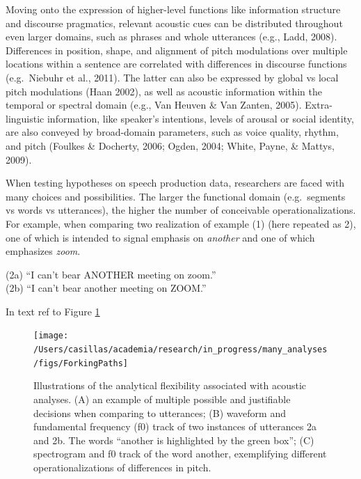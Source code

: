 \documentclass[
  english,
  man,floatsintext]{apa6}
\begin{document}
Moving onto the expression of higher-level functions like information structure and discourse pragmatics, relevant acoustic cues can be distributed throughout even larger domains, such as phrases and whole utterances (e.g., Ladd, 2008).
Differences in position, shape, and alignment of pitch modulations over multiple locations within a sentence are correlated with differences in discourse functions (e.g.~Niebuhr et al., 2011).
The latter can also be expressed by global vs local pitch modulations (Haan 2002), as well as acoustic information within the temporal or spectral domain (e.g., Van Heuven \& Van Zanten, 2005).
Extra-linguistic information, like speaker's intentions, levels of arousal or social identity, are also conveyed by broad-domain parameters, such as voice quality, rhythm, and pitch (Foulkes \& Docherty, 2006; Ogden, 2004; White, Payne, \& Mattys, 2009).

When testing hypotheses on speech production data, researchers are faced with many choices and possibilities.
The larger the functional domain (e.g.~segments vs words vs utterances), the higher the number of conceivable operationalizations.
For example, when comparing two realization of example (1) (here repeated as 2), one of which is intended to signal emphasis on \emph{another} and one of which emphasizes \emph{zoom}.

(2a) \enquote{I can't bear ANOTHER meeting on zoom.}\\
(2b) \enquote{I can't bear another meeting on ZOOM.}

In text ref to Figure \ref{fig:forkingPaths}



\begin{figure}
\texttt{[image: /Users/casillas/academia/research/in\_progress/many\_analyses/figs/ForkingPaths]} \caption{Illustrations of the analytical flexibility associated with acoustic analyses. (A) an example of multiple possible and justifiable decisions when comparing to utterances; (B) waveform and fundamental frequency (f0) track of two instances of utterances 2a and 2b. The words ``another is highlighted by the green box''; (C) spectrogram and f0 track of the word another, exemplifying different operationalizations of differences in pitch.}\label{fig:forkingPaths}
\end{figure}
\end{document}
